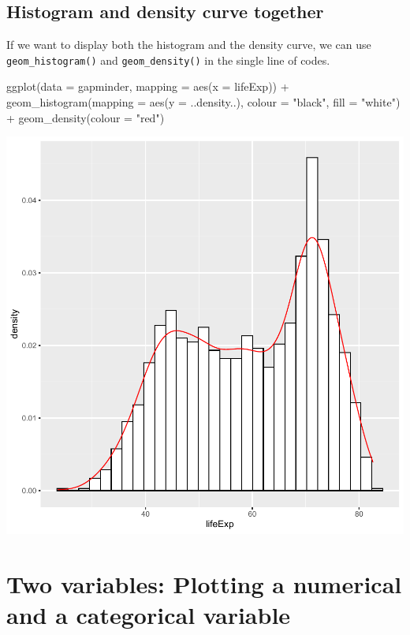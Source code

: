 \documentclass[
]{book}
\makeatletter
\newenvironment{Shaded}{\begin{snugshade}}{\end{snugshade}}
\newcommand{\AttributeTok}[1]{\textcolor[rgb]{0.61,0.61,0.61}{#1}}
\newcommand{\FunctionTok}[1]{\textcolor[rgb]{0,0,0}{#1}}
\newcommand{\NormalTok}[1]{#1}
\newcommand{\SpecialCharTok}[1]{\textcolor[rgb]{0,0,0}{#1}}
\newcommand{\StringTok}[1]{\textcolor[rgb]{0.5,0.5,0.5}{#1}}
\newenvironment{kframe}{%
\medskip{}
\setlength{\fboxsep}{.8em}
 \def\at@end@of@kframe{}%
 \ifinner\ifhmode%
  \def\at@end@of@kframe{\end{minipage}}%
  \begin{minipage}{\columnwidth}%
 \fi\fi%
 \def\FrameCommand##1{\hskip\@totalleftmargin \hskip-\fboxsep
 \colorbox{shadecolor}{##1}\hskip-\fboxsep
     \hskip-\linewidth \hskip-\@totalleftmargin \hskip\columnwidth}%
 \MakeFramed {\advance\hsize-\width
   \@totalleftmargin\z@ \linewidth\hsize
   \@setminipage}}%
 {\par\unskip\endMakeFramed%
 \at@end@of@kframe}
\renewenvironment{Shaded}{\begin{kframe}}{\end{kframe}}
\makeatother
\begin{document}
\hypertarget{histogram-and-density-curve-together}{%
\subsection{Histogram and density curve together}\label{histogram-and-density-curve-together}}

If we want to display both the histogram and the density curve, we can use \texttt{geom\_histogram()} and \texttt{geom\_density()} in the single line of codes.

\begin{Shaded}
\begin{Highlighting}[]
\FunctionTok{ggplot}\NormalTok{(}\AttributeTok{data =}\NormalTok{ gapminder, }\AttributeTok{mapping =} \FunctionTok{aes}\NormalTok{(}\AttributeTok{x =}\NormalTok{ lifeExp)) }\SpecialCharTok{+} 
  \FunctionTok{geom\_histogram}\NormalTok{(}\AttributeTok{mapping =} \FunctionTok{aes}\NormalTok{(}\AttributeTok{y =}\NormalTok{ ..density..), }
                 \AttributeTok{colour =} \StringTok{"black"}\NormalTok{, }\AttributeTok{fill =} \StringTok{"white"}\NormalTok{) }\SpecialCharTok{+}
  \FunctionTok{geom\_density}\NormalTok{(}\AttributeTok{colour =} \StringTok{"red"}\NormalTok{)}
\end{Highlighting}
\end{Shaded}

\begin{center}\includegraphics[width=0.7\linewidth,keepaspectratio]{Multivariable_Data_Analysis_files/figure-latex/unnamed-chunk-80-1} \end{center}

\hypertarget{two-variables-plotting-a-numerical-and-a-categorical-variable}{%
\section{Two variables: Plotting a numerical and a categorical variable}\label{two-variables-plotting-a-numerical-and-a-categorical-variable}}
\end{document}
